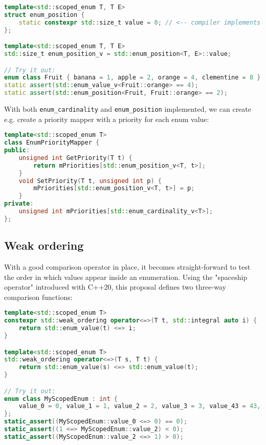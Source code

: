 \documentclass[
  format=manuscript,
  screen=true,
  review=false,
  nonacm=true,
  timestamp=true,
  balance=false]{acmart}
\begin{document}
\begin{lstlisting}[language=Cpp]
template<std::scoped_enum T, T E>
struct enum_position {
    static constexpr std::size_t value = 0; // <-- compiler implements this
};

template<std::scoped_enum T, T E>
std::size_t enum_position_v = std::enum_position<T, E>::value;

// Try it out:
enum class Fruit { banana = 1, apple = 2, orange = 4, clementine = 8 };
static assert(std::enum_value_v<Fruit::orange> == 4);
static assert(std::enum_position<Fruit, Fruit::orange> == 2);
\end{lstlisting}

\noindent
With both \texttt{enum\_cardinality} and \texttt{enum\_position} implemented, we
can create e.g. create a priority mapper with a priority for each enum value:\vspace{2mm}

\begin{lstlisting}[language=Cpp]
template<std::scoped_enum T>
class EnumPriorityMapper {
public:
    unsigned int GetPriority(T t) {
        return mPriorities[std::enum_position_v<T, t>];
    }
    void SetPriority(T t, unsigned int p) {
        mPriorities[std::enum_position_v<T, t>] = p;
    }
private:
    unsigned int mPriorities[std::enum_cardinality_v<T>];
};
\end{lstlisting}


\subsection{Weak ordering}

With a good comparison operator in place, it becomes straight-forward to test
the order in which values appear inside an enumeration. Using the "spaceship operator"
introduced with C++20, this proposal defines two three-way comparison functions:\vspace{2mm}

\begin{lstlisting}[language=Cpp]
template<std::scoped_enum T>
constexpr std::weak_ordering operator<=>(T t, std::integral auto i) {
    return std::enum_value(t) <=> i;
}

template<std::scoped_enum T>
std::weak_ordering operator<=>(T s, T t) {
    return std::enum_value(s) <=> std::enum_value(t);
}

// Try it out:
enum class MyScopedEnum : int {
    value_0 = 0, value_1 = 1, value_2 = 2, value_3 = 3, value_43 = 43, value_57 = 57
};
static_assert((MyScopedEnum::value_0 <=> 0) == 0);
static_assert((1 <=> MyScopedEnum::value_2) < 0);
static_assert((MyScopedEnum::value_2 <=> 1) > 0);
\end{lstlisting}
\end{document}
